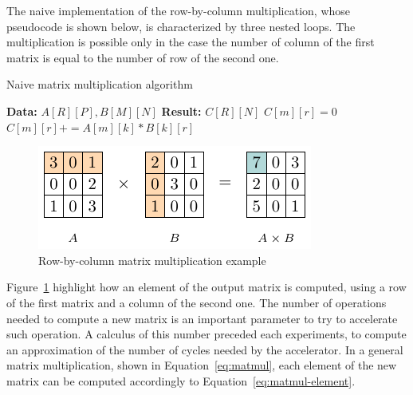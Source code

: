 The naive implementation of the row-by-column multiplication, whose pseudocode is shown below, is characterized by three nested loops.
The multiplication is possible only in the case the number of column of the first matrix is equal to the number of row of the second one.

\begin{algorithm}[H]
    \label{alg:matmul_pseudo}
    \caption{Naive matrix multiplication algorithm}
    \label{alg:var}
    \label{protocol1}
    \begin{algorithmic}[1]
    \STATE \textbf{Data:} $A[R][P], B[M][N]$
    \STATE \textbf{Result:} $C[R][N]$
    \STATE $C[m][r] = 0$
    \STATE $C[m][r] += A[m][k] * B[k][r]$
    \ENDFOR
    \ENDFOR
    \ENDFOR
    \ENDIF
    \end{algorithmic}
\end{algorithm}

\begin{figure}[t]
    \centering
    \includegraphics[height=0.24\textwidth]{Images/row-by-col-mult-example}
    \caption{Row-by-column matrix multiplication example}
    \label{fig:row-by-col-mul-example}
\end{figure}

Figure~\ref{fig:row-by-col-mul-example} highlight how an element of the output matrix is computed, using a row of the first matrix and a column of the second one.
The number of operations needed to compute a new matrix is an important parameter to try to accelerate such operation.
A calculus of this number preceded each experiments, to compute an approximation of the number of cycles needed by the accelerator.
In a general matrix multiplication, shown in Equation~\ref{eq:matmul}, each element of the new matrix can be computed accordingly to Equation~\ref{eq:matmul-element}.

